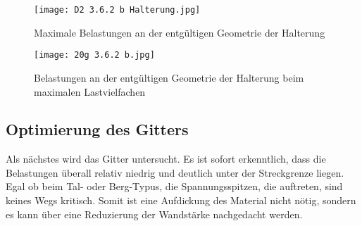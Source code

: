 \begin{figure}[h]
	\begin{minipage}[t]{0.5\linewidth}
		\centering
		\texttt{[image: D2 3.6.2 b Halterung.jpg]}
		\caption{Maximale Belastungen an der entgültigen Geometrie der Halterung}
		\label{abb_Halterung_max}
	\end{minipage}
	\hfill
	\begin{minipage}[t]{0.41\linewidth}
		\centering
		\texttt{[image: 20g 3.6.2 b.jpg]}
		\caption{Belastungen an der entgültigen Geometrie der Halterung beim maximalen Lastvielfachen}
		\label{abb_Halterung_20g}
	\end{minipage}
\end{figure}
\subsection{Optimierung des Gitters}
Als nächstes wird das Gitter untersucht. Es ist sofort erkenntlich, dass die Belastungen überall relativ niedrig und deutlich unter der Streckgrenze liegen. Egal ob beim Tal- oder Berg-Typus, die Spannungsspitzen, die auftreten, sind keines Wegs kritisch. Somit ist eine Aufdickung des Material nicht nötig, sondern es kann über eine Reduzierung der Wandstärke nachgedacht werden.

